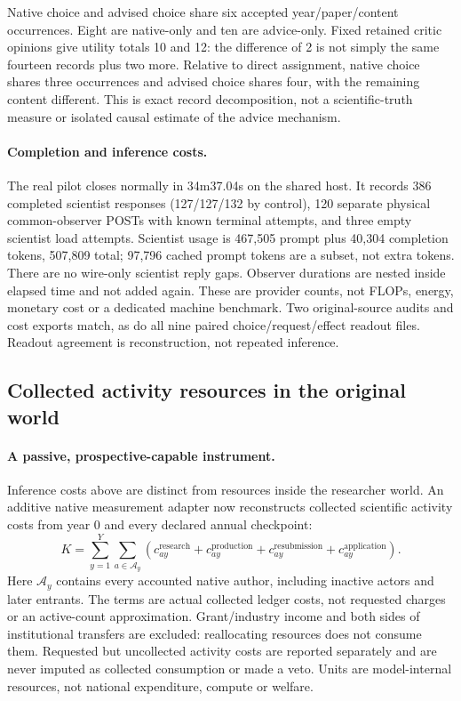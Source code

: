 Native choice and advised choice share six accepted year/paper/content
occurrences. Eight are native-only and ten are advice-only. Fixed retained
critic opinions give utility totals 10 and 12: the difference of 2 is not
simply the same fourteen records plus two more. Relative to direct assignment,
native choice shares three occurrences and advised choice shares four, with
the remaining content different. This is exact record decomposition, not a
scientific-truth measure or isolated causal estimate of the advice mechanism.

\paragraph{Completion and inference costs.}
The real pilot closes normally in 34m37.04s on the shared host. It records
386 completed scientist responses (127/127/132 by control), 120 separate physical
common-observer POSTs with known terminal attempts, and three empty scientist
load attempts. Scientist usage is 467,505 prompt plus 40,304 completion tokens,
507,809 total; 97,796 cached prompt tokens are a subset, not extra tokens.
There are no wire-only scientist reply gaps. Observer durations are nested
inside elapsed time and not added again. These are provider counts, not FLOPs,
energy, monetary cost or a dedicated machine benchmark. Two original-source
audits and cost exports match, as do all nine paired choice/request/effect
readout files. Readout agreement is reconstruction, not repeated inference.

\subsection{Collected activity resources in the original world}
\paragraph{A passive, prospective-capable instrument.}
Inference costs above are distinct from resources inside the researcher world.
An additive native measurement adapter now reconstructs collected scientific
activity costs from year 0 and every declared annual checkpoint:
\begin{equation}
 K=\sum_{y=1}^{Y}\sum_{a\in\mathcal A_y}
 \left(c^{\mathrm{research}}_{ay}+c^{\mathrm{production}}_{ay}
       +c^{\mathrm{resubmission}}_{ay}+c^{\mathrm{application}}_{ay}\right).
 \label{eq:native-collected-cost}
\end{equation}
Here $\mathcal A_y$ contains every accounted native author, including inactive
actors and later entrants. The terms are actual collected ledger costs, not
requested charges or an active-count approximation. Grant/industry income and
both sides of institutional transfers are excluded: reallocating resources
does not consume them. Requested but uncollected activity costs are reported
separately and are never imputed as collected consumption or made a veto.
Units are model-internal resources, not national expenditure, compute or welfare.

